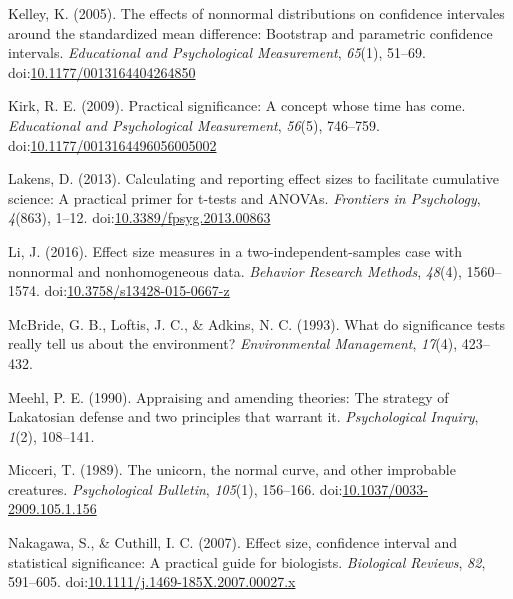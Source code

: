 \documentclass[man]{apa6}
\begin{document}
\leavevmode\hypertarget{ref-Kelley_2005}{}%
Kelley, K. (2005). The effects of nonnormal distributions on confidence intervales around the standardized mean difference: Bootstrap and parametric confidence intervals. \emph{Educational and Psychological Measurement}, \emph{65}(1), 51--69. doi:\href{https://doi.org/10.1177/0013164404264850}{10.1177/0013164404264850}

\leavevmode\hypertarget{ref-Kirk_2009}{}%
Kirk, R. E. (2009). Practical significance: A concept whose time has come. \emph{Educational and Psychological Measurement}, \emph{56}(5), 746--759. doi:\href{https://doi.org/10.1177/0013164496056005002\%20}{10.1177/0013164496056005002 }

\leavevmode\hypertarget{ref-Lakens_2013}{}%
Lakens, D. (2013). Calculating and reporting effect sizes to facilitate cumulative science: A practical primer for t-tests and ANOVAs. \emph{Frontiers in Psychology}, \emph{4}(863), 1--12. doi:\href{https://doi.org/10.3389/fpsyg.2013.00863}{10.3389/fpsyg.2013.00863}

\leavevmode\hypertarget{ref-Li_2016}{}%
Li, J. (2016). Effect size measures in a two-independent-samples case with nonnormal and nonhomogeneous data. \emph{Behavior Research Methods}, \emph{48}(4), 1560--1574. doi:\href{https://doi.org/10.3758/s13428-015-0667-z}{10.3758/s13428-015-0667-z}

\leavevmode\hypertarget{ref-McBride_et_al_1993}{}%
McBride, G. B., Loftis, J. C., \& Adkins, N. C. (1993). What do significance tests really tell us about the environment? \emph{Environmental Management}, \emph{17}(4), 423--432.

\leavevmode\hypertarget{ref-Meehl_1990}{}%
Meehl, P. E. (1990). Appraising and amending theories: The strategy of Lakatosian defense and two principles that warrant it. \emph{Psychological Inquiry}, \emph{1}(2), 108--141.

\leavevmode\hypertarget{ref-Micceri_1989}{}%
Micceri, T. (1989). The unicorn, the normal curve, and other improbable creatures. \emph{Psychological Bulletin}, \emph{105}(1), 156--166. doi:\href{https://doi.org/10.1037/0033-2909.105.1.156}{10.1037/0033-2909.105.1.156}

\leavevmode\hypertarget{ref-Nakagawa_and_Cuthill_2007}{}%
Nakagawa, S., \& Cuthill, I. C. (2007). Effect size, confidence interval and statistical significance: A practical guide for biologists. \emph{Biological Reviews}, \emph{82}, 591--605. doi:\href{https://doi.org/10.1111/j.1469-185X.2007.00027.x}{10.1111/j.1469-185X.2007.00027.x}
\end{document}
